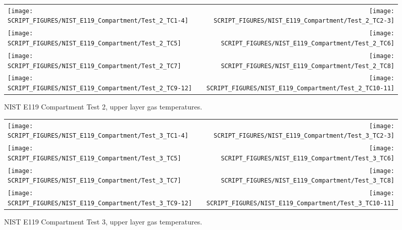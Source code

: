 \begin{figure}[p]
\begin{tabular*}{\textwidth}{l@{\extracolsep{\fill}}r}
\texttt{[image: SCRIPT\_FIGURES/NIST\_E119\_Compartment/Test\_2\_TC1-4]} &
\texttt{[image: SCRIPT\_FIGURES/NIST\_E119\_Compartment/Test\_2\_TC2-3]} \\
\texttt{[image: SCRIPT\_FIGURES/NIST\_E119\_Compartment/Test\_2\_TC5]} &
\texttt{[image: SCRIPT\_FIGURES/NIST\_E119\_Compartment/Test\_2\_TC6]} \\
\texttt{[image: SCRIPT\_FIGURES/NIST\_E119\_Compartment/Test\_2\_TC7]} &
\texttt{[image: SCRIPT\_FIGURES/NIST\_E119\_Compartment/Test\_2\_TC8]} \\
\texttt{[image: SCRIPT\_FIGURES/NIST\_E119\_Compartment/Test\_2\_TC9-12]} &
\texttt{[image: SCRIPT\_FIGURES/NIST\_E119\_Compartment/Test\_2\_TC10-11]}
\end{tabular*}
\caption[NIST E119 Compartment Test 2, upper layer gas temperatures temperatures]
{NIST E119 Compartment Test 2, upper layer gas temperatures.}
\label{NIST_E119_Compartment_HGL_2}
\end{figure}

\begin{figure}[p]
\begin{tabular*}{\textwidth}{l@{\extracolsep{\fill}}r}
\texttt{[image: SCRIPT\_FIGURES/NIST\_E119\_Compartment/Test\_3\_TC1-4]} &
\texttt{[image: SCRIPT\_FIGURES/NIST\_E119\_Compartment/Test\_3\_TC2-3]} \\
\texttt{[image: SCRIPT\_FIGURES/NIST\_E119\_Compartment/Test\_3\_TC5]} &
\texttt{[image: SCRIPT\_FIGURES/NIST\_E119\_Compartment/Test\_3\_TC6]} \\
\texttt{[image: SCRIPT\_FIGURES/NIST\_E119\_Compartment/Test\_3\_TC7]} &
\texttt{[image: SCRIPT\_FIGURES/NIST\_E119\_Compartment/Test\_3\_TC8]} \\
\texttt{[image: SCRIPT\_FIGURES/NIST\_E119\_Compartment/Test\_3\_TC9-12]} &
\texttt{[image: SCRIPT\_FIGURES/NIST\_E119\_Compartment/Test\_3\_TC10-11]}
\end{tabular*}
\caption[NIST E119 Compartment Test 3, upper layer gas temperatures temperatures]
{NIST E119 Compartment Test 3, upper layer gas temperatures.}
\label{NIST_E119_Compartment_HGL_3}
\end{figure}

\clearpage

